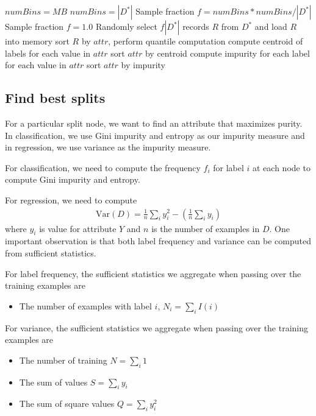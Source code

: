 \begin{algorithm}[findSplitBins$(D^*, MB)$] \label{alg:findSplitBins}
\begin{algorithmic}[1]
        \State $numBins = MB$
    \Else
        \State $numBins = \left|D^*\right|$
    \EndIf
        \State Sample fraction $f = numBins * numBins/{\left|D^*\right|}$
    \Else
        \State Sample fraction $f = 1.0$
    \EndIf
    \State Randomly select $f\left| D^* \right|$ records $R$ from $D^*$ and load $R$ into memory
            \State sort $R$ by $attr$, perform quantile computation
        \Else
                \State compute centroid of labels for each value in $attr$
                \State sort $attr$ by centroid
            \Else
                \State compute impurity for each label for each value in $attr$
                \State sort $attr$ by impurity
            \EndIf
        \EndIf
    \EndFor
\end{algorithmic}
\end{algorithm}

\subsection{Find best splits}
For a particular split node, we want to find an attribute that maximizes purity.
In classification, we use Gini impurity and entropy as our impurity measure and
in regression, we use variance as the impurity measure.

For classification, we need to compute the frequency $f_i$ for label $i$ at each
node to compute Gini impurity and entropy.

For regression, we need to compute
\begin{align*}
    \text{Var}(D) = \frac{1}{n} \sum_{i} y_i^2 - \left(\frac{1}{n} \sum_{i}y_{i} \right)
\end{align*}
where $y_{i}$ is value for attribute $Y$ and $n$ is the number of examples in $D$.
One important observation is that both label frequency and variance can be
computed from sufficient statistics.

For label frequency, the sufficient statistics we aggregate when passing over
the training examples are
\begin{itemize}
\item The number of examples with label $i$, $N_i = \sum_i I(i)$
\end{itemize}
For variance, the sufficient statistics we aggregate when passing over the
training examples are
\begin{itemize}
\item The number of training $N = \sum_i 1$
\item The sum of values $S = \sum_i y_i$
\item The sum of square values $Q = \sum_i y_i^2$
\end{itemize}

